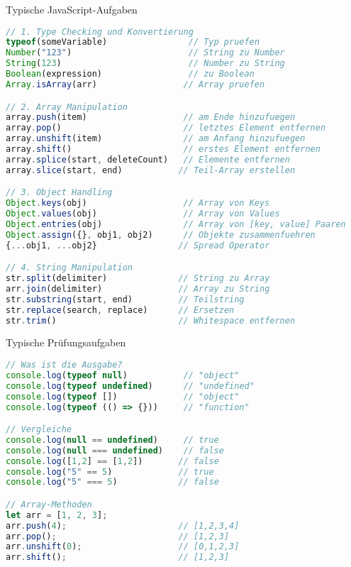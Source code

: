 \begin{KR}{Typische JavaScript-Aufgaben}
\begin{lstlisting}[language=JavaScript, style=basesmol]
// 1. Type Checking und Konvertierung
typeof(someVariable)                // Typ pruefen
Number("123")                       // String zu Number
String(123)                         // Number zu String
Boolean(expression)                 // zu Boolean
Array.isArray(arr)                 // Array pruefen

// 2. Array Manipulation
array.push(item)                   // am Ende hinzufuegen
array.pop()                        // letztes Element entfernen
array.unshift(item)                // am Anfang hinzufuegen
array.shift()                      // erstes Element entfernen
array.splice(start, deleteCount)   // Elemente entfernen
array.slice(start, end)           // Teil-Array erstellen

// 3. Object Handling
Object.keys(obj)                   // Array von Keys
Object.values(obj)                 // Array von Values
Object.entries(obj)                // Array von [key, value] Paaren
Object.assign({}, obj1, obj2)      // Objekte zusammenfuehren
{...obj1, ...obj2}                // Spread Operator

// 4. String Manipulation
str.split(delimiter)              // String zu Array
arr.join(delimiter)               // Array zu String
str.substring(start, end)         // Teilstring
str.replace(search, replace)      // Ersetzen
str.trim()                        // Whitespace entfernen
\end{lstlisting}
\end{KR}

\begin{examplecode}{Typische Prüfungsaufgaben}
\begin{lstlisting}[language=JavaScript, style=basesmol]
// Was ist die Ausgabe?
console.log(typeof null)           // "object"
console.log(typeof undefined)      // "undefined"
console.log(typeof [])             // "object"
console.log(typeof (() => {}))     // "function"

// Vergleiche
console.log(null == undefined)     // true
console.log(null === undefined)    // false
console.log([1,2] == [1,2])       // false
console.log("5" == 5)             // true
console.log("5" === 5)            // false

// Array-Methoden
let arr = [1, 2, 3];
arr.push(4);                      // [1,2,3,4]
arr.pop();                        // [1,2,3]
arr.unshift(0);                   // [0,1,2,3]
arr.shift();                      // [1,2,3]
\end{lstlisting}
\end{examplecode}

